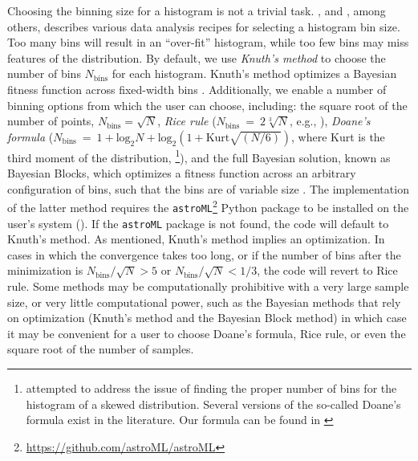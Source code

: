 \documentclass{emulateapj}
\begin{document}
Choosing the binning size for a histogram is not a trivial task.  \citet{hogg08}, and \citet{astroMLText}, among others, describes various data analysis recipes for selecting a histogram bin size. Too many bins will result in an ``over-fit'' histogram, while too few bins may miss features of the distribution. 
By default, we use \emph{Knuth's method} to choose the number of bins $N_\mathrm{bins}$ for each histogram. Knuth's method  optimizes a Bayesian fitness function across fixed-width bins \citep{knuth06}. Additionally, we enable a number of binning options from which the user can choose, including: 
the square root of the number of points, $N_\mathrm{bins}=\sqrt{N}$, \emph{Rice rule} ($N_\mathrm{bins}~=~2\sqrt[3]{N}$, e.g., \citealt{hastie09}), 
\emph{Doane's formula} ($N_\mathrm{bins}~=~1 + \mathrm{log}_2{N} + \mathrm{log}_2\left(1 + \mathrm{Kurt}\sqrt{(N / 6)}\right)$, where Kurt is the third moment of the distribution, \citealt{doane76}\footnote{\citet{doane76} attempted to address the issue of finding the proper number of bins for the histogram of a skewed distribution. Several versions of the so-called Doane's formula exist in the literature. Our formula can be found in \citealt{bonate11}}), and the full Bayesian solution, known as Bayesian Blocks, which optimizes a fitness function across an arbitrary configuration of bins, such that the bins are of variable size \citep{scargle13}. The implementation of the latter method requires the \verb=astroML=\footnote{\url{https://github.com/astroML/astroML}} Python package to be installed on the user's system (\citealt{astroml}). If the \verb=astroML= package is not found, the code will default to Knuth's method. 
As mentioned, Knuth's method implies an optimization. In cases in which the convergence takes too long, or if the number of bins after the minimization is  $N_\mathrm{bins}/\sqrt{N} > 5$ or $N_\mathrm{bins}/\sqrt{N} < 1/3$, the code will revert to Rice rule.
Some methods may be computationally prohibitive with a very large sample size, or very little computational power, such as the Bayesian methods that rely on optimization (Knuth's method and the Bayesian Block method) in which case it may be convenient for a user to choose Doane's formula, Rice rule, or even the square root of the number of samples. 
\end{document}
